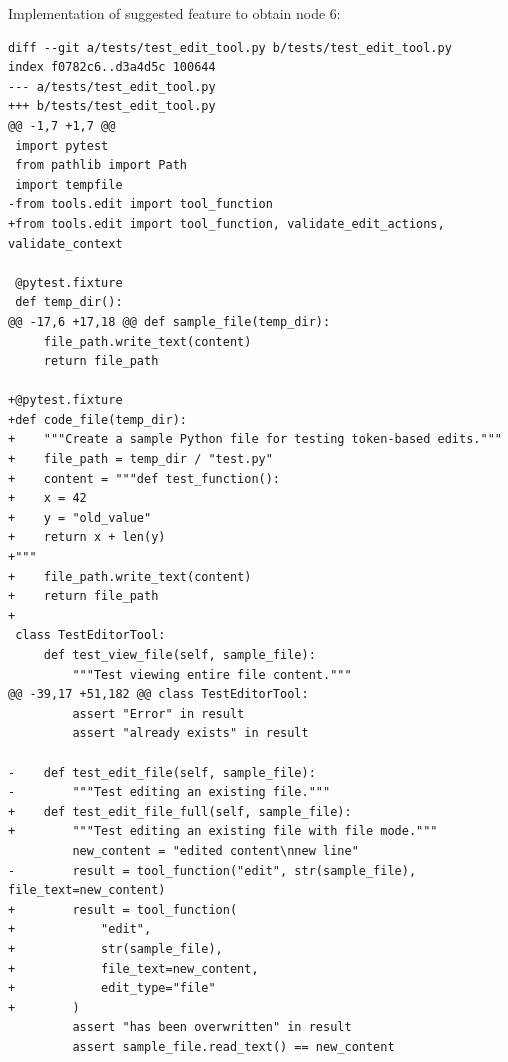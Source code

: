 \documentclass{article} %
\begin{document}
Implementation of suggested feature to obtain node 6:

\begin{lstlisting}[style=diffstyle]
diff --git a/tests/test_edit_tool.py b/tests/test_edit_tool.py
index f0782c6..d3a4d5c 100644
--- a/tests/test_edit_tool.py
+++ b/tests/test_edit_tool.py
@@ -1,7 +1,7 @@
 import pytest
 from pathlib import Path
 import tempfile
-from tools.edit import tool_function
+from tools.edit import tool_function, validate_edit_actions, validate_context
 
 @pytest.fixture
 def temp_dir():
@@ -17,6 +17,18 @@ def sample_file(temp_dir):
     file_path.write_text(content)
     return file_path
 
+@pytest.fixture
+def code_file(temp_dir):
+    """Create a sample Python file for testing token-based edits."""
+    file_path = temp_dir / "test.py"
+    content = """def test_function():
+    x = 42
+    y = "old_value"
+    return x + len(y)
+"""
+    file_path.write_text(content)
+    return file_path
+
 class TestEditorTool:
     def test_view_file(self, sample_file):
         """Test viewing entire file content."""
@@ -39,17 +51,182 @@ class TestEditorTool:
         assert "Error" in result
         assert "already exists" in result
 
-    def test_edit_file(self, sample_file):
-        """Test editing an existing file."""
+    def test_edit_file_full(self, sample_file):
+        """Test editing an existing file with file mode."""
         new_content = "edited content\nnew line"
-        result = tool_function("edit", str(sample_file), file_text=new_content)
+        result = tool_function(
+            "edit", 
+            str(sample_file), 
+            file_text=new_content, 
+            edit_type="file"
+        )
         assert "has been overwritten" in result
         assert sample_file.read_text() == new_content
 

\end{lstlisting}
\end{document}
